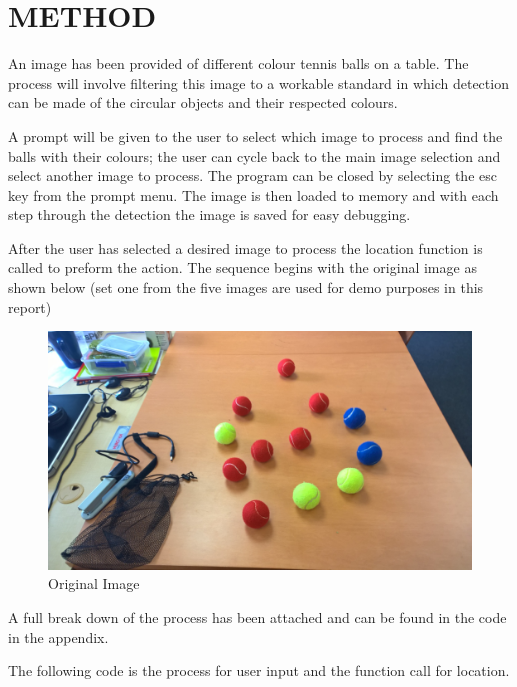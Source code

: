 \documentclass[a4paper, 10pt]{article}
\begin{document}

\section{METHOD}

An image has been provided of different colour tennis balls on a table. The process will involve filtering this image to a workable standard in which detection can be made of the circular objects and their respected colours. 

A prompt will be given to the user to select which image to process and find the balls with their colours; the user can cycle back to the main image selection and select another image to process. The program can be closed by selecting the esc key from the prompt menu. The image is then loaded to memory and with each step through the detection the image is saved for easy debugging. 

After the user has selected a desired image to process the location function is called to preform the action. The sequence begins with the original image as shown below (set one from the five images are used for demo purposes in this report)

\begin{figure}[H]
  \includegraphics[width=\linewidth]{images/1}
  \caption{Original Image}
  \label{fig:Original Image}
\end{figure}

A full break down of the process has been attached and can be found in the code in the appendix.

The following code is the process for user input and the function call for location.
\end{document}
